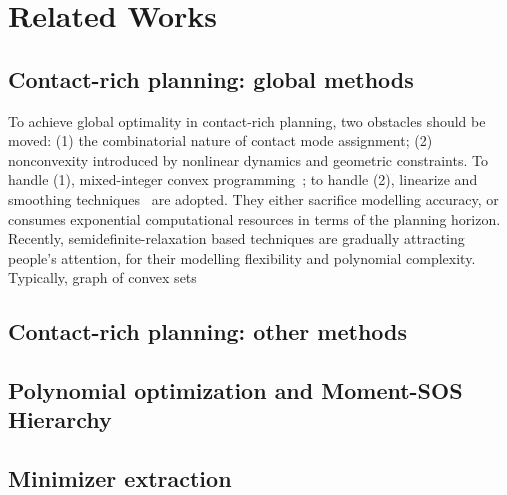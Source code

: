 
\section{Related Works}
\label{sec:relatedworks}

\subsection{Contact-rich planning: global methods}
To achieve global optimality in contact-rich planning, two obstacles should be moved: (1) the combinatorial nature of contact mode assignment; (2) nonconvexity introduced by nonlinear dynamics and geometric constraints. To handle (1), mixed-integer convex programming~\cite{ding2020iros-motionplanning-multilegged-mixedinteger,marcucci2020arxiv-warmstart-mixedinteger-mpc}; to handle (2), linearize and smoothing techniques~\cite{pang2023tro-global-planning-contact-rich-quasi-dynamic-contact-models} are adopted. They either sacrifice modelling accuracy, or consumes exponential computational resources in terms of the planning horizon. 
Recently, semidefinite-relaxation based techniques are gradually attracting people's attention, for their modelling flexibility and polynomial complexity. Typically, graph of convex sets

\subsection{Contact-rich planning: other methods}

\subsection{Polynomial optimization and Moment-SOS Hierarchy}

\subsection{Minimizer extraction}
